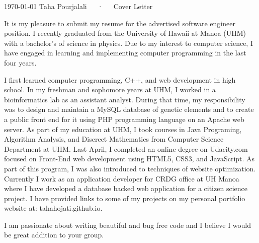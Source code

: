 \documentclass[11pt, a4paper]{awesome-cv}
\begin{document}
\makecvheader

\makecvfooter
  {\today}
  {Taha Pourjalali~~~·~~~Cover Letter}
  {}

\makelettertitle

\begin{cvletter}

It is my pleasure to submit my resume for the advertised software engineer position. I recently graduated from the University of Hawaii at Manoa (UHM) with a bachelor’s of science in physics. Due to my interest to computer science, I have engaged in learning and implementing computer programming in the last four years.

I first learned computer programming, C++, and web development in high school.  In my freshman and sophomore years at UHM, I worked in a bioinformatics lab as an assistant analyst. During that time, my responsibility was to design and maintain a MySQL database of genetic elements and to create a public front end for it using PHP programming language on an Apache web server. As part of my education at UHM, I took courses in Java Programing, Algorithm Analysis, and Discreet Mathematics from Computer Science Department at UHM.  Last April, I completed an online degree on Udacity.com focused on Front-End web development using HTML5, CSS3, and JavaScript. As part of this program, I was also introduced to techniques of website optimization.  Currently I work as an application developer for CRDG office at UH Manoa where I have developed a database backed web application for a citizen science project.  I have provided links to some of my projects on my personal portfolio website at: tahahojati.github.io.

I am passionate about writing beautiful and bug free code and I believe I would be great addition to your group. 


\end{cvletter}


\makeletterclosing
\end{document}
